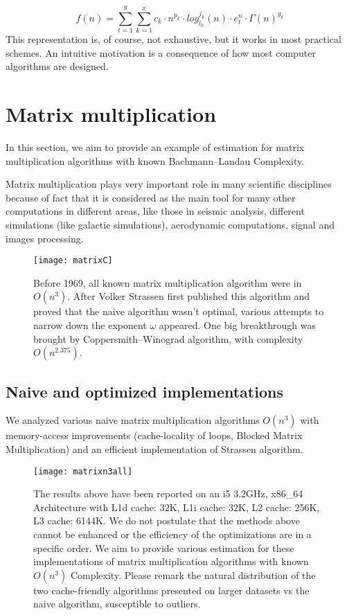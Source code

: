 \[ f(n) =\sum\limits_{t=1}^{y}  \sum\limits_{k=1}^{x} c_{k} \cdot n^{p_{k}} \cdot log_{l_{k}}^{j_{k}}(n) \cdot e_{t}^{n} \cdot  \Gamma(n)^{g_{k}} \]
This representation is, of course, not exhaustive, but it works in most practical schemes. An intuitive motivation is a consequence of how most computer algorithms are designed. \cite{calotoiu2018automatic}



\section{Matrix multiplication}
In this section, we aim to provide an example of estimation for matrix multiplication algorithms with known Bachmann–Landau Complexity.

Matrix multiplication plays very important role in many scientific disciplines because of fact that it is considered as the main tool for many other computations in different areas, like those in seismic analysis, different simulations (like galactic simulations), aerodynamic computations, signal and images processing. \cite{4588528}


\begin{figure}[H]
\centering
\texttt{[image: matrixC]}
\caption{Before 1969, all known matrix multiplication algorithm were in $O(n^3)$. After Volker Strassen first published this algorithm and proved that the naive algorithm wasn't optimal, various attempts to narrow down the exponent $\omega$ appeared. One big breakthrough was brought by Coppersmith–Winograd algorithm, with complexity $O(n^{2.375})$. }
\end{figure}

\subsection{Naive and optimized implementations}
We analyzed various naive matrix multiplication algorithms $O(n^3)$ with memory-access improvements (cache-locality of loops, Blocked Matrix Multiplication) and an efficient implementation of Strassen algorithm.

\begin{figure}[H]
\centering
\texttt{[image: matrixn3all]}
\caption{The results above have been reported on an i5 3.2GHz, x86\_64 Architecture with L1d cache: 32K, L1i cache: 32K, L2 cache: 256K, L3 cache:  6144K. We do not postulate that the methods above cannot be enhanced
 or the efficiency of the optimizations are in a specific order. We aim to provide various estimation for these implementations of matrix multiplication algorithms with known $O(n^3)$ Complexity. Please remark the natural distribution of the two cache-friendly algorithms presented on larger datasets vs the naive algorithm, susceptible to outliers.}
\end{figure}


